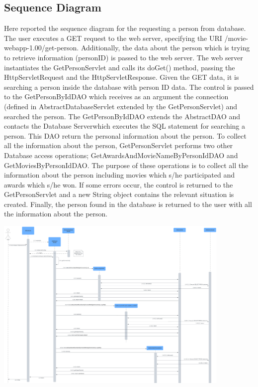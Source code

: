 \subsection{Sequence Diagram}

Here reported the sequence diagram for the requesting a person from database. The user executes a GET request to the web server, specifying the URI /movie-webapp-1.00/get-person. Additionally, the data about the person which is trying to retrieve information (personID) is passed to the web server. The web server instantiates the GetPersonServlet and calls its doGet() method, passing the HttpServletRequest and the HttpServletResponse. Given the GET data, it is searching a person inside the database with person ID data. The control is passed to the GetPersonByIdDAO which receives as an argument the connection (defined in AbstractDatabaseServlet extended by the GetPersonServlet) and searched the person. The GetPersonByIdDAO extends the AbstractDAO and contacts the Database Serverwhich executes the SQL statement for searching a person. This DAO return the personal information about the person. To collect all the information about the person, GetPersonServlet performs two other Database access operations; GetAwardsAndMovieNameByPersonIdDAO and GetMoviesByPersonIdDAO. The purpose of these operations is to collect all the information about the person including movies which s/he participated and awards which s/he won. If some errors occur, the control is returned to the GetPersonServlet and a new String object contains the relevant situation is created. Finally, the person found in the database is returned to the user with all the information about the person. 


\bigskip

\includegraphics[angle=90, width=0.85\textwidth]{pictures/GetPersonServlet-1.png}

